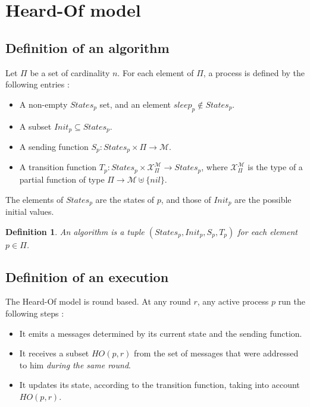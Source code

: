 \documentclass{article}
\newtheorem{definition}{Definition}
\begin{document}
\section{Heard-Of model}

\subsection{Definition of an algorithm}

Let $\Pi$ be a set of cardinality $n$. For each element of $\Pi$, a process is defined by the following entries :

\begin{itemize}
	\item A non-empty $States_p$ set, and an element $sleep_p \notin States_p$.
	\item A subset $Init_p \subseteq States_p$.
	\item A sending function $S_p : States_p \times \Pi \rightarrow \mathcal{M}$.
	\item A transition function $T_p : States_p \times \mathcal{X}_\Pi^{\mathcal{M}} \rightarrow States_p$,
		where $\mathcal{X}_\Pi^{\mathcal{M}}$ is the type of a partial function
		of type $\Pi \rightarrow \mathcal{M} \uplus \{nil\}$.
\end{itemize}

The elements of $States_p$ are the states of $p$, and those of $Init_p$ are the possible initial values.

\begin{definition}
	An algorithm is a tuple $(States_p, Init_p, S_p, T_p)$ for each element $p \in \Pi$.
\end{definition}


\subsection{Definition of an execution}

The Heard-Of model is round based. At any round $r$, any active process $p$ run the following steps :

\begin{itemize}
	\item It emits a messages determined by its current state and the sending function.
	\item It receives a subset $HO(p,r)$ from the set of messages that were addressed to him
		\textit{during the same round}.
	\item It updates its state, according to the transition function, taking into account $HO(p,r)$.
\end{itemize}
\end{document}

